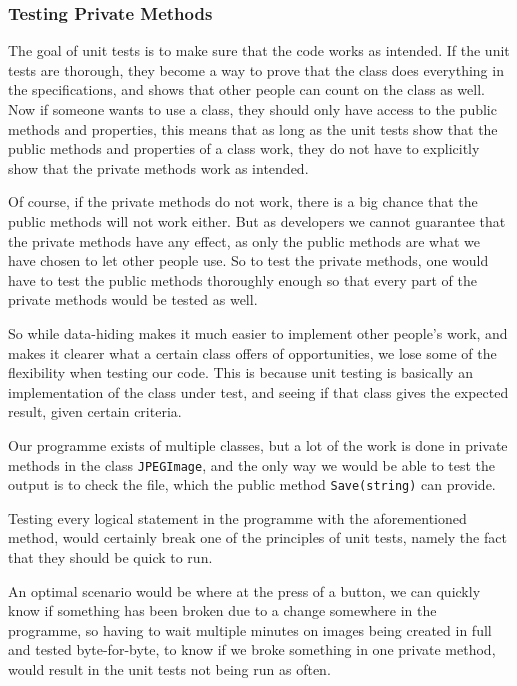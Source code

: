\subsubsection{Testing Private Methods}
The goal of unit tests is to make sure that the code works as intended.
If the unit tests are thorough, they become a way to prove that the class does everything in the specifications, and shows that other people can count on the class as well.
Now if someone wants to use a class, they should only have access to the public methods and properties, this means that as long as the unit tests show that the public methods and properties of a class work, they do not have to explicitly show that the private methods work as intended.

Of course, if the private methods do not work, there is a big chance that the public methods will not work either.
But as developers we cannot guarantee that the private methods have any effect, as only the public methods are what we have chosen to let other people use. 
So to test the private methods, one would have to test the public methods thoroughly enough so that every part of the private methods would be tested as well. 

So while data-hiding makes it much easier to implement other people's work, and makes it clearer what a certain class offers of opportunities, we lose some of the flexibility when testing our code. This is because unit testing is basically an implementation of the class under test, and seeing if that class gives the expected result, given certain criteria. 

Our programme exists of multiple classes, but a lot of the work is done in private methods in the class \lstinline|JPEGImage|, and the only way we would be able to test the output is to check the file, which the public method \lstinline|Save(string)| can provide.

Testing every logical statement in the programme with the aforementioned method, would certainly break one of the principles of unit tests, namely the fact that they should be quick to run.

An optimal scenario would be where at the press of a button, we can quickly know if something has been broken due to a change somewhere in the programme, so having to wait multiple minutes on images being created in full and tested byte-for-byte, to know if we broke something in one private method, would result in the unit tests not being run as often. 

